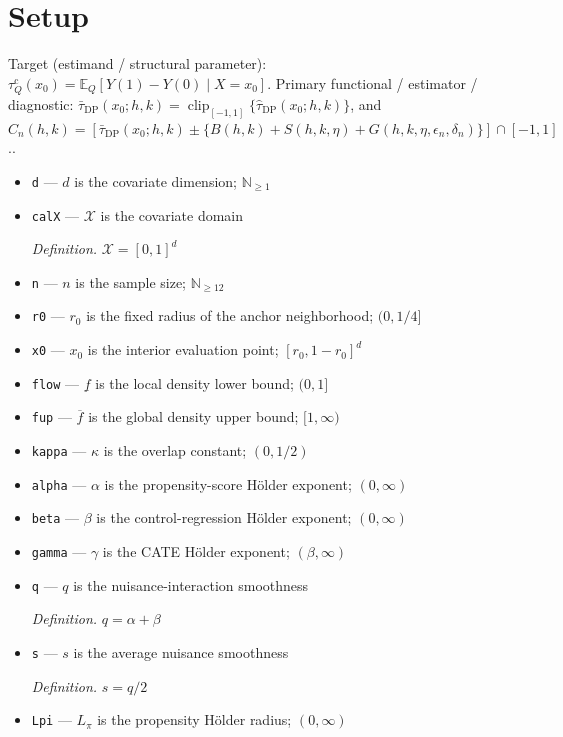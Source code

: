 \documentclass{article}
\begin{document}
\section{Setup}

Target (estimand / structural parameter): \(\tau_Q^{\mathrm c}(x_0)=\mathbb E_Q[Y(1)-Y(0)\mid X=x_0]\).
Primary functional / estimator / diagnostic: \(\bar\tau_{\mathrm{DP}}(x_0;h,k)=\operatorname{clip}_{[-1,1]}\{\widehat\tau_{\mathrm{DP}}(x_0;h,k)\}\), and \(C_n(h,k)=[\bar\tau_{\mathrm{DP}}(x_0;h,k)\pm\{B(h,k)+S(h,k,\eta)+G(h,k,\eta,\epsilon_n,\delta_n)\}]\cap[-1,1]\)..
\begin{itemize}
  \item \texttt{d} --- \(d\) is the covariate dimension; \(\mathbb N_{\ge 1}\)
  \item \texttt{calX} --- \(\mathcal X\) is the covariate domain
  \par\smallskip\noindent\emph{Definition.} \(\mathcal X=[0,1]^d\)
  \item \texttt{n} --- \(n\) is the sample size; \(\mathbb N_{\ge 12}\)
  \item \texttt{r0} --- \(r_0\) is the fixed radius of the anchor neighborhood; \((0,1/4]\)
  \item \texttt{x0} --- \(x_0\) is the interior evaluation point; \([r_0,1-r_0]^d\)
  \item \texttt{flow} --- \(\underline f\) is the local density lower bound; \((0,1]\)
  \item \texttt{fup} --- \(\overline f\) is the global density upper bound; \([1,\infty)\)
  \item \texttt{kappa} --- \(\kappa\) is the overlap constant; \((0,1/2)\)
  \item \texttt{alpha} --- \(\alpha\) is the propensity-score Hölder exponent; \((0,\infty)\)
  \item \texttt{beta} --- \(\beta\) is the control-regression Hölder exponent; \((0,\infty)\)
  \item \texttt{gamma} --- \(\gamma\) is the CATE Hölder exponent; \((\beta,\infty)\)
  \item \texttt{q} --- \(q\) is the nuisance-interaction smoothness
  \par\smallskip\noindent\emph{Definition.} \(q=\alpha+\beta\)
  \item \texttt{s} --- \(s\) is the average nuisance smoothness
  \par\smallskip\noindent\emph{Definition.} \(s=q/2\)
  \item \texttt{Lpi} --- \(L_\pi\) is the propensity Hölder radius; \((0,\infty)\)

\end{itemize}
\end{document}
